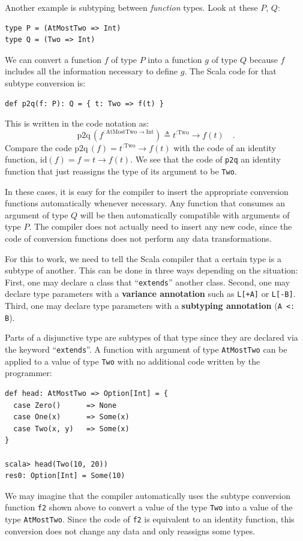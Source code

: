Another example is  subtyping between \emph{function} types. Look
at these $P$, $Q$:
\begin{lstlisting}
type P = (AtMostTwo => Int)
type Q = (Two => Int)
\end{lstlisting}
We can convert a function $f$ of type $P$ into a function $g$ of
type $Q$ because $f$ includes all the information necessary to define
$g$. The Scala code for that subtype conversion is:
\begin{lstlisting}
def p2q(f: P): Q = { t: Two => f(t) }
\end{lstlisting}
This is written in the code notation as:
\[
\text{p2q}\,(f^{:\text{AtMostTwo}\rightarrow\text{Int}})\triangleq t^{:\text{Two}}\rightarrow f(t)\quad.
\]
Compare the code $\text{p2q}\,(f)=t^{:\text{Two}}\rightarrow f(t)$
with the code of an identity function, $\text{id}\left(f\right)=f=t\rightarrow f(t)$.
We see that the code of \lstinline!p2q! an identity function that
just reassigns the type of its argument to be \lstinline!Two!.

In these cases, it is easy for the compiler to insert the appropriate
conversion functions automatically whenever necessary. Any function
that consumes an argument of type $Q$ will be then automatically
compatible with arguments of type $P$. The compiler does not actually
need to insert any new code, since the code of conversion functions
does not perform any data transformations.

For this to work, we need to tell the Scala compiler that a certain
type is a subtype of another. This can be done in three ways depending
on the situation: First, one may declare a class that \textsf{``}\lstinline!extends!\textsf{''}
another class. Second, one may declare type parameters with a \textbf{variance
annotation} such as \lstinline!L[+A]! or \lstinline!L[-B]!. Third,
one may declare type parameters with a \textbf{subtyping annotation}
(\lstinline!A <: B!).

Parts of a disjunctive type are subtypes of that type since they are
declared via the keyword \textsf{``}\lstinline!extends!\textsf{''}. A
function with argument of type \lstinline!AtMostTwo! can be applied
to a value of type \lstinline!Two! with no additional code written
by the programmer:
\begin{lstlisting}
def head: AtMostTwo => Option[Int] = {
  case Zero()      => None
  case One(x)      => Some(x)
  case Two(x, y)   => Some(x)
}

scala> head(Two(10, 20))
res0: Option[Int] = Some(10)
\end{lstlisting}
We may imagine that the compiler automatically uses the subtype conversion
function \lstinline!f2! shown above to convert a value of the type
\lstinline!Two! into a value of the type \lstinline!AtMostTwo!.
Since the code of \lstinline!f2! is equivalent to an identity function,
this conversion does not change any data and only reassigns some types. 


